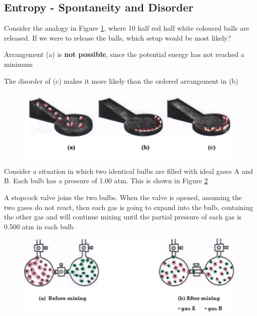 \subsection{Entropy - Spontaneity and Disorder}
Consider the analogy in Figure \ref{fig:spontaneity-and-disorder}, where 10 half red half white 
coloured balls are released. If we were to release the balls, which setup would be most likely?
\begin{bulleted-list}
    \item Arrangement (a) is \textbf{not possible}, since the potential energy has not reached
        a minimum
    \item The disorder of (c) makes it more likely than the ordered arrangement in (b)
\end{bulleted-list}
\begin{figure}[ht!]
    \centering
    \includegraphics[width=0.6 \textwidth]{../figures/spontaneity-and-disorder.png}
    \caption{}
    \label{fig:spontaneity-and-disorder}
\end{figure}

Consider a situation in which two identical bulbs are filled with ideal gases A and B. Each
bulb has a pressure of 1.00 atm. This is shown in Figure \ref{fig:ideal-gases-spontaneity-and-disorder}
\begin{bulleted-list}
    \item A stopcock valve joins the two bulbs. When the valve is opened, assuming the two gases
        do not react, then each gas is going to expand into the bulb, containing the other gas
        and will continue mixing until the partial pressure of each gas is 0.500 atm in each bulb
\end{bulleted-list}

\begin{figure}[ht!]
    \centering
    \includegraphics[width=0.6 \textwidth]{../figures/ideal-gases-spontaneity-and-disorder.png}
    \caption{}
    \label{fig:ideal-gases-spontaneity-and-disorder}
\end{figure}

